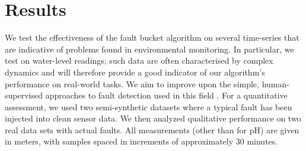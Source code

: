 \documentclass[letterpaper]{article}
\begin{document}

\section{Results}
We test the effectiveness of the fault bucket algorithm on several time-series
that are indicative of problems found in environmental
monitoring. In particular, we test on water-level readings; such data
are often characterised by complex dynamics and will therefore provide
a good indicator of our algorithm's performance on real-world
tasks. We aim to improve upon the simple, human-supervised approaches
to fault detection used in this field
\cite{wagner2006guidelines}. For a quantitative assessment, we used two semi-synthetic datasets
where a typical fault has been injected into clean sensor data. We
then analyzed qualitative performance on two real data sets with actual
faults. All measurements (other than for pH) are given in meters, with samples spaced in
increments of approximately 30 minutes. %


\end{document}

